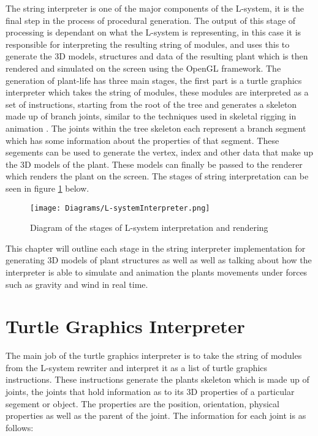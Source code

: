 
\lettrine[lines=3]{T}{}he string interpreter is one of the major components of the L-system, it is the final step in the process of procedural generation. The output of this stage of processing is dependant on what the L-system is representing, in this case it is responsible for interpreting the resulting string of modules, and uses this to generate the 3D models, structures and data of the resulting plant which is then rendered and simulated on the screen using the OpenGL framework. The generation of plant-life has three main stages, the first part is a turtle graphics interpreter which takes the string of modules, these modules are interpreted as a set of instructions, starting from the root of the tree and generates a skeleton made up of branch joints, similar to the techniques used in skeletal rigging in animation \cite{gregory2014game}. The joints within the tree skeleton each represent a branch segment which has some information about the properties of that segment. These segements can be used to generate the vertex, index and other data that make up the 3D models of the plant. These models can finally be passed to the renderer which renders the plant on the screen. The stages of string interpretation can be seen in figure \ref{l-system interpreter} below. 

\begin{figure}[htbp]
	{\centering
		\vspace{7px}
		\texttt{[image: Diagrams/L-systemInterpreter.png]}
		\caption{Diagram of the stages of L-system interpretation and rendering} \label{l-system interpreter}
	}
\end{figure}

\noindent
This chapter will outline each stage in the string interpreter implementation for generating 3D models of plant structures as well as well as talking about how the interpreter is able to simulate and animation the plants movements under forces such as gravity and wind in real time. \\

\section{Turtle Graphics Interpreter}


The main job of the turtle graphics interpreter is to take the string of modules from the L-system rewriter and interpret it as a list of turtle graphics instructions. These instructions generate the plants skeleton which is made up of joints, the joints that hold information as to its 3D properties of a particular segement or object. The properties are the position, orientation, physical properties as well as the parent of the joint. The information for each joint is as follows:

